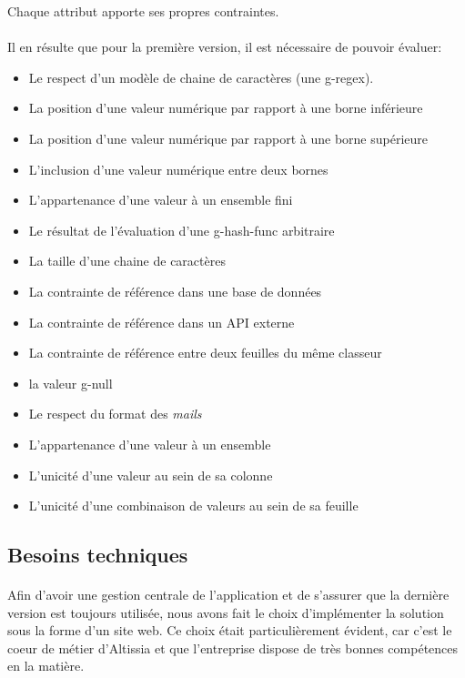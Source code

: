 Chaque attribut apporte ses propres contraintes.

\paragraph{}
Il en résulte que pour la première version, il est nécessaire de pouvoir évaluer:
\begin{itemize}
    \item Le respect d'un modèle de chaine de caractères (une \gls{g-regex}).
    \item La position d'une valeur numérique par rapport à une borne inférieure
    \item La position d'une valeur numérique par rapport à une borne supérieure
    \item L'inclusion d'une valeur numérique entre deux bornes
    \item L'appartenance d'une valeur à un ensemble fini
    \item Le résultat de l'évaluation d'une \gls{g-hash-func} arbitraire
    \item La taille d'une chaine de caractères
    \item La contrainte de référence\fnmark{} dans une base de données
    \item La contrainte de référence dans un API externe
    \item La contrainte de référence entre deux feuilles du même classeur
    \item la valeur \gls{g-null}
    \item Le respect du format des \textit{mails}
    \item L'appartenance d'une valeur à un ensemble
    \item L'unicité d'une valeur au sein de sa colonne
    \item L'unicité d'une combinaison de valeurs au sein de sa feuille
\end{itemize}

\subsection{Besoins techniques}
\label{subsec:tech-needs}

\paragraph{}
Afin d'avoir une gestion centrale de l'application et de s'assurer que la dernière version est toujours utilisée, nous avons fait le choix d'implémenter la solution sous la forme d'un site web.
Ce choix était particulièrement évident, car c'est le coeur de métier d'Altissia et que l'entreprise dispose de très bonnes compétences en la matière.

